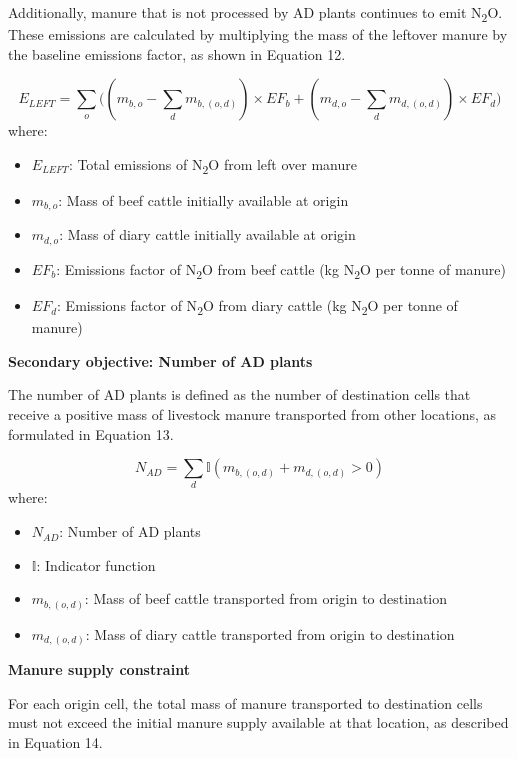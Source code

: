 \documentclass[12pt]{article}
\begin{document}
Additionally, manure that is not processed by AD plants continues to emit N\textsubscript{2}O. These emissions are calculated by multiplying the mass of the leftover manure by the baseline emissions factor, as shown in Equation 12.

\begin{equation}
  E_{LEFT} = \sum_o\biggl((m_{b,o} - \sum_d m_{b, (o, d)}) \times EF_{b} + (m_{d,o} - \sum_d m_{d, (o, d)}) \times EF_d \biggr)
\end{equation}
where:
\begin{itemize}
  \item $E_{LEFT}$: Total emissions of N\textsubscript{2}O from left over manure
  \item $m_{b,o}$: Mass of beef cattle initially available at origin
  \item $m_{d,o}$: Mass of diary cattle initially available at origin
  \item $EF_b$: Emissions factor of N\textsubscript{2}O from beef cattle (kg N\textsubscript{2}O per tonne of manure)
  \item $EF_d$: Emissions factor of N\textsubscript{2}O from diary cattle (kg N\textsubscript{2}O per tonne of manure)
\end{itemize}

\vspace{10pt}
\textbf{Secondary objective: Number of AD plants}

The number of AD plants is defined as the number of destination cells that receive a positive mass of livestock manure transported from other locations, as formulated in Equation 13.

\begin{equation}
  N_{AD} = \sum_d \mathbb{I}(m_{b, (o, d)} + m_{d, (o, d)} > 0)
\end{equation}
where:
\begin{itemize}
  \item $N_{AD}$: Number of AD plants
  \item $\mathbb{I}$: Indicator function
  \item $m_{b, (o, d)}$: Mass of beef cattle transported from origin to destination
  \item $m_{d, (o, d)}$: Mass of diary cattle transported from origin to destination
\end{itemize}

\vspace{10pt}
\textbf{Manure supply constraint}

For each origin cell, the total mass of manure transported to destination cells must not exceed the initial manure supply available at that location, as described in Equation 14.
\end{document}
